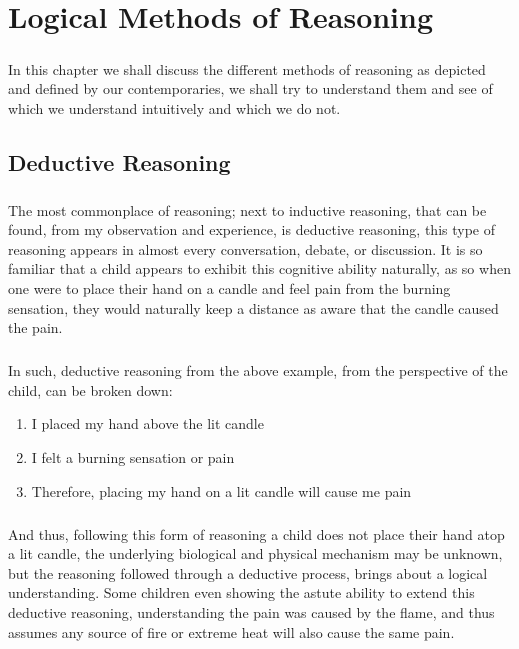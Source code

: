 \chapter{Logical Methods of Reasoning}\label{chapter:logicalmethodsofreasoning}

\paragraph{}In this chapter we shall discuss the different methods of reasoning as depicted and defined by our contemporaries, we shall try to understand them and see of which we understand intuitively and which we do not.

\section{Deductive Reasoning}

\paragraph{}The most commonplace of reasoning; next to inductive reasoning, that can be found, from my observation and experience, is deductive reasoning, this type of reasoning appears in almost every conversation, debate, or discussion. It is so familiar that a child appears to exhibit this cognitive ability naturally, as so when one were to place their hand on a candle and feel pain from the burning sensation, they would naturally keep a distance as aware that the candle caused the pain.

\paragraph{}In such, deductive reasoning from the above example, from the perspective of the child, can be broken down:

\begin{enumerate}[label=\roman*]
    \item I placed my hand above the lit candle
    \item I felt a burning sensation or pain
    \item Therefore, placing my hand on a lit candle will cause me pain
\end{enumerate}

\paragraph{}And thus, following this form of reasoning a child does not place their hand atop a lit candle, the underlying biological and physical mechanism may be unknown, but the reasoning followed through a deductive process, brings about a logical understanding. Some children even showing the astute ability to extend this deductive reasoning, understanding the pain was caused by the flame, and thus assumes any source of fire or extreme heat will also cause the same pain.


